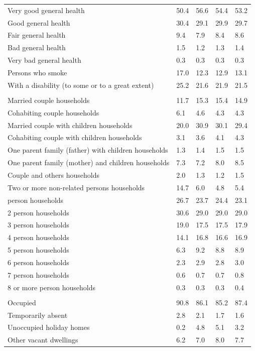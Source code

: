 \documentclass{article}
\begin{document}
\begin{table}[h]
\begin{tabular}{KTTTT}
    \hline
Very good general health & 50.4& 56.6&54.4& 53.2\\
Good general health & 30.4& 29.1& 29.9& 29.7\\
Fair general health & 9.4& 7.9&8.4& 8.6\\
Bad general health & 1.5& 1.2&1.3& 1.4\\
Very bad general health & 0.3& 0.3&0.3& 0.3\\
    \hline
Persons who smoke & 17.0& 12.3&12.9& 13.1\\
    \hline
With a disability (to some or to a great extent) & 25.2& 21.6&21.9& 21.5\\
\hline
    \\ 
    \hline
Married couple households & 11.7& 15.3& 15.4& 14.9\\
Cohabiting couple households & 6.1& 4.6& 4.3& 4.3\\
Married couple with children households & 20.0& 30.9& 30.1& 29.4\\
Cohabiting couple with children households & 3.1& 3.6& 4.1& 4.3\\
One parent family (father) with  children households & 1.3& 1.4& 1.5& 1.5\\
One parent family (mother) and children households & 7.3& 7.2& 8.0& 8.5\\
Couple and others households  & 2.0& 1.3& 1.2& 1.5\\
Two or more non-related persons households & 14.7&  6.0&  4.8&  5.4\\
     person households & 26.7& 23.7& 24.4& 23.1\\
2 person households & 30.6& 29.0& 29.0& 29.0\\
3 person households & 19.0& 17.5& 17.5& 17.9\\
4 person households & 14.1& 16.8& 16.6& 16.9\\
5 person households & 6.3& 9.2& 8.8& 8.9\\
6 person households & 2.3& 2.9& 2.8& 3.0\\
7 person households & 0.6& 0.7& 0.7& 0.8\\
8 or more person households & 0.3& 0.3& 0.3& 0.4\\
\hline
    \\ 
    \hline
Occupied & 90.8& 86.1& 85.2& 87.4\\
Temporarily absent & 2.8& 2.1& 1.7& 1.6\\
Unoccupied holiday homes & 0.2& 4.8& 5.1& 3.2\\
Other vacant dwellings & 6.2& 7.0& 8.0& 7.7\\
\hline
\end{tabular}
\end{table}
\end{document}
